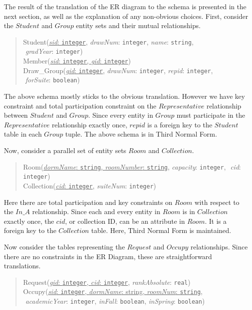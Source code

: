 \documentclass{article}
\begin{document}
The result of the translation of the ER diagram to the schema is presented in the next section, as well as the explanation of any non-obvious choices. First, consider the $Student$ and $Group$ entity sets and their mutual relationships.

\begin{quote}
  \noindent Student(\underline{\textit{sid}: \texttt{integer}}, \textit{drawNum}: \texttt{integer}, \textit{name}: \texttt{string}, \\ $\mbox{}$ \qquad \quad  \textit{gradYear}: \texttt{integer}) \\
  \noindent Member(\underline{\textit{sid}: \texttt{integer}, \textit{gid}: \texttt{integer}}) \\
  \noindent Draw\_Group(\underline{\textit{gid}: \texttt{integer}}, \textit{drawNum}: \texttt{integer}, \textit{repid}: \texttt{integer}, \\ $\mbox{}$ \qquad \quad \textit{forSuite}: \texttt{boolean})\\
\end{quote}

The above schema mostly sticks to the obvious translation.  However we have key constraint and total participation constraint on the $Representative$ relationship between $Student$ and $Group$. Since every entity in $Group$ must participate in the $Representative$ relationship exactly once, $repid$ is a foreign key to the $Student$ table in each $Group$ tuple. The above schema is in Third Normal Form.

Now, consider a parallel set of entity sets $Room$ and $Collection$.

\begin{quote}
  \noindent Room(\underline{\textit{dormName}: \texttt{string}, \textit{roomNumber}: \texttt{string}}, \textit{capacity}: \texttt{integer}, $\mbox{}$ \qquad \quad \textit{cid}: \texttt{integer})\\
  \noindent Collection(\underline{\textit{cid}: \texttt{integer}}, \textit{suiteNum}: \texttt{integer})
\end{quote}

Here there are total participation and key constraints on $Room$ with respect to the $In\_A$ relationship.  Since each and every entity in $Room$ is in $Collection$ exactly once, the $cid$, or collection ID, can be an attribute in $Room$. It is a foreign key to the $Collection$ table. Here, Third Normal Form is maintained.

Now consider the tables representing the $Request$ and $Occupy$ relationships. Since there are no constraints in the ER Diagram, these are straightforward translations.
\begin{quote}
  \noindent Request(\underline{\textit{gid}: \texttt{integer}, \textit{cid}: \texttt{integer}}, \textit{rankAbsolute}: \texttt{real}) \\
  \noindent Occupy(\underline{\textit{sid}: \texttt{integer}, \textit{dormName}: string, \textit{roomNum}: \texttt{string}}, \\ $\mbox{}$ \qquad \quad \textit{academicYear}: \texttt{integer}, \textit{inFall}: \texttt{boolean}, \textit{inSpring}: \texttt{boolean}) \\
\end{quote}
\end{document}
